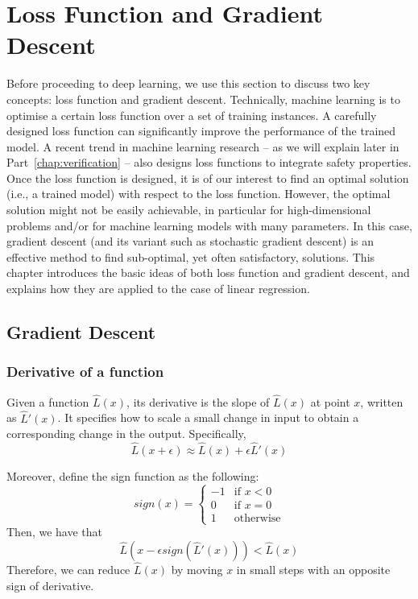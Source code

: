 \newpage
\chapter{Loss Function and Gradient Descent}

Before proceeding to deep learning, we use this section to discuss two key concepts: loss function and gradient descent. Technically, machine learning is to optimise a certain loss function over a set of training instances. A carefully designed loss function can significantly improve the performance of the trained model. A recent trend in machine learning research -- as we will explain later in Part~\ref{chap:verification} -- also designs loss functions to integrate safety properties. 
Once the loss function is designed, it is of our interest to find an optimal solution (i.e., a trained model) with respect to the loss function. However, the optimal solution might not be easily achievable, in particular for high-dimensional problems and/or for  machine learning models with many parameters. 
In this case, 
gradient descent (and its variant such as stochastic gradient descent) is an effective method to find sub-optimal, yet often satisfactory, solutions. This chapter introduces the basic ideas of both loss function and gradient descent, and explains how they are applied to the case of linear regression. 




\section{Gradient Descent}

\subsection*{Derivative of a function}

Given a function $\hat{L}({x})$, its derivative is the slope of $\hat{L}({x})$ at point ${x}$, written as $\hat{L}'({x})$. It specifies how to scale a small change in input to obtain a corresponding change in the output. Specifically, 
\begin{equation}
    \hat{L}({x}+\epsilon) \approx \hat{L}({x}) + \epsilon \hat{L}'({x})
\end{equation}

Moreover, define the sign function as the following: 
\begin{equation}
    sign(x) = 
    \begin{cases}
    -1 & \text{if }x < 0 \\
    0 & \text{if }x = 0 \\
    1 & \text{otherwise} 
    \end{cases}
\end{equation}
Then, we have that 
\begin{equation}
    \hat{L}({x}-\epsilon sign(\hat{L}'({x}))) < \hat{L}({x})
\end{equation}
Therefore, we can reduce $\hat{L}({x})$  by moving ${x}$ in small steps with an opposite sign of derivative.  

